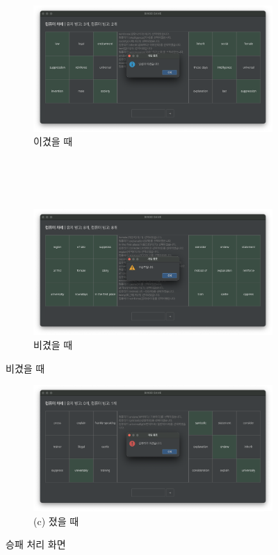 \begin{figure}[H]
    \begin{subfigure}{\textwidth}
        \centering
        \includegraphics[scale=0.3]{img/game-3x3-victory.png}
        \caption{이겼을 때}
    \end{subfigure}
    \\\\\\
    \begin{subfigure}{\textwidth}
        \centering
        \includegraphics[scale=0.3]{img/game-3x3-draw.png}
        \caption{비겼을 때}
    \end{subfigure}
\end{figure}
\setcounter{figure}{6}
\begin{figure}[h]
    \begin{subfigure}{\textwidth}
        \centering
        \includegraphics[scale=0.3]{img/game-3x3-defeat.png}\\
        (c) 졌을 때
    \end{subfigure}
    \caption{승패 처리 화면}
\end{figure}

